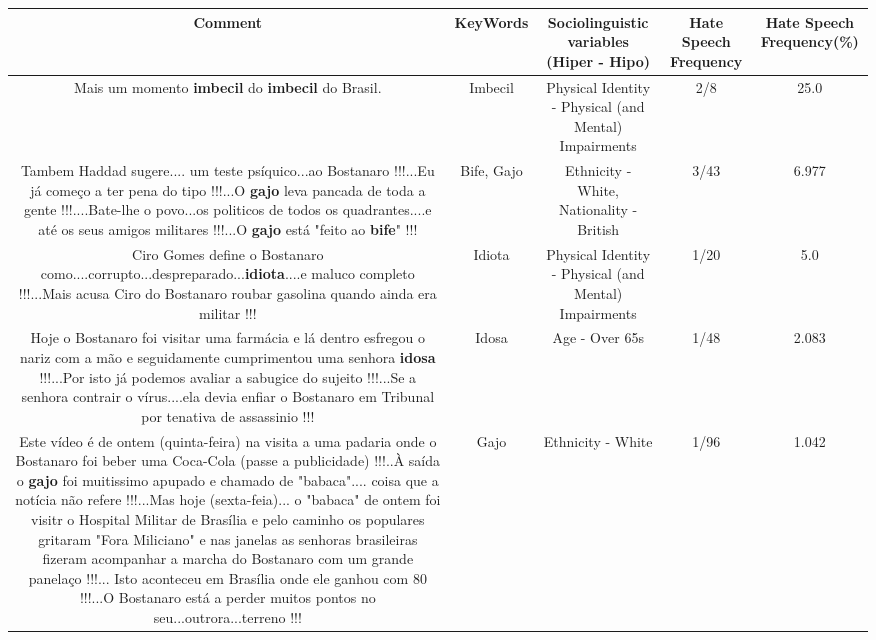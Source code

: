 \documentclass[11pt]{article}
\newlength\mylength
\begin{document}
\begin{center}
\setlength\mylength{\dimexpr\textwidth - 1\arrayrulewidth - 50\tabcolsep}
\begin{longtable}{|C{.65\mylength}|C{.30\mylength}|C{.12\mylength}|C{.12\mylength}|C{.12\mylength}|}
\hline
\textbf{Comment} & \textbf{KeyWords} & \textbf{Sociolinguistic variables (Hiper - Hipo)}  & \textbf{Hate Speech Frequency} & \textbf{Hate Speech Frequency(\%)} \\
\hline{}\small Mais um momento \textbf{imbecil} do \textbf{imbecil} do Brasil.\normalsize   & Imbecil & Physical Identity - Physical (and Mental) Impairments & 2/8 & 25.0 \\  \hline
  \small Tambem Haddad sugere.... um teste psíquico...ao Bostanaro !!!...Eu já começo a ter pena do tipo !!!...O \textbf{gajo} leva pancada de toda a gente !!!....Bate-lhe o povo...os politicos de todos os quadrantes....e até os seus amigos militares !!!...O \textbf{gajo} está "feito ao \textbf{bife}" !!!\normalsize   & Bife, Gajo & Ethnicity - White, Nationality - British & 3/43 & 6.977 \\  \hline
  \small Ciro Gomes define o Bostanaro como....corrupto...despreparado...\textbf{idiota}....e maluco completo !!!...Mais acusa Ciro do Bostanaro roubar gasolina quando ainda era militar !!!\normalsize   & Idiota & Physical Identity - Physical (and Mental) Impairments & 1/20 & 5.0 \\  \hline
  \small Hoje o Bostanaro  foi visitar uma farmácia e lá dentro esfregou o nariz com a mão e seguidamente cumprimentou uma senhora \textbf{idosa} !!!...Por isto já podemos avaliar a sabugice do sujeito !!!...Se a senhora contrair o vírus....ela devia enfiar o Bostanaro em Tribunal por tenativa de assassinio !!!\normalsize   & Idosa & Age - Over 65s & 1/48 & 2.083 \\  \hline
  \small Este vídeo é de ontem (quinta-feira) na visita a uma padaria onde o Bostanaro foi beber uma Coca-Cola (passe a publicidade) !!!..À saída o \textbf{gajo} foi muitissimo apupado e chamado de "babaca".... coisa que a notícia não refere !!!...Mas hoje (sexta-feia)... o "babaca" de ontem foi visitr o Hospital Militar de Brasília e pelo caminho os populares gritaram "Fora Miliciano" e nas janelas as senhoras brasileiras fizeram acompanhar a marcha do Bostanaro com um grande panelaço !!!... Isto aconteceu em Brasília onde ele ganhou com 80 !!!...O Bostanaro está a perder muitos pontos no seu...outrora...terreno !!!\normalsize   & Gajo & Ethnicity - White & 1/96 & 1.042 \\  \hline

\end{longtable}
\end{center}
\end{document}

